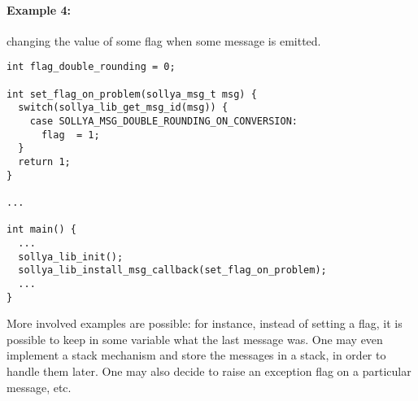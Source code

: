 \documentclass[a4paper]{article}
\begin{document}
\paragraph{Example 4:} changing the value of some flag when some message is emitted.
\begin{center}
\begin{minipage}{15cm}\begin{Verbatim}[frame=single]
int flag_double_rounding = 0;

int set_flag_on_problem(sollya_msg_t msg) {
  switch(sollya_lib_get_msg_id(msg)) {
    case SOLLYA_MSG_DOUBLE_ROUNDING_ON_CONVERSION:
      flag  = 1;
  }
  return 1;
}

...

int main() {
  ...
  sollya_lib_init();
  sollya_lib_install_msg_callback(set_flag_on_problem);
  ...
}

\end{Verbatim}
\end{minipage}\end{center}

More involved examples are possible: for instance, instead of setting a flag, it is possible to keep in some variable what the last message was. One may even implement a stack mechanism and store the messages in a stack, in order to handle them later. One may also decide to raise an exception flag on a particular message, etc.
\end{document}
